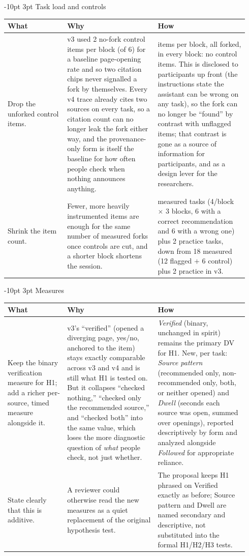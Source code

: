 \documentclass[9pt,letterpaper]{extarticle}
\makeatletter
\newcommand{\rowsep}{\noalign{\vskip 1.5pt}\arrayrulecolor{black!35}\hline\arrayrulecolor{black}\noalign{\vskip 1.5pt}}
\renewcommand\section{\@startsection{section}{1}{\z@}%
  {-10pt \@plus -2pt \@minus -1pt}{3pt}%
  {\sffamily\bfseries\large\color{accent}}}
\let\oldsection\section
\renewcommand{\section}{\needspace{7\baselineskip}\oldsection}
\newcommand{\wwh}{\toprule
\sffamily\bfseries\color{accent} What & \sffamily\bfseries\color{accent} Why & \sffamily\bfseries\color{accent} How \\
\midrule}
\newenvironment{wwhtable}{\footnotesize
\begin{longtable}{@{}>{\raggedright\arraybackslash}p{0.23\linewidth}>{\raggedright\arraybackslash}p{0.355\linewidth}>{\raggedright\arraybackslash}p{0.355\linewidth}@{}}
\wwh}{\bottomrule\end{longtable}}
\makeatother
\begin{document}
\section{Task load and controls}
\begin{wwhtable}
Drop the unforked control items. &
v3 used 2 no-fork control items per block (of 6) for a baseline
page-opening rate and so two citation chips never signalled a fork by
themselves. Every v4 trace already cites two sources on every task, so a
citation count can no longer leak the fork either way, and the
provenance-only form is itself the baseline for how often people check
when nothing announces anything. &
4 items per block, all forked, in every block: no control items. This is
disclosed to participants up front (the instructions state the assistant
can be wrong on any task), so the fork can no longer be ``found'' by
contrast with unflagged items; that contrast is gone as a source of
information for participants, and as a design lever for the researchers. \\
\rowsep
Shrink the item count. &
Fewer, more heavily instrumented items are enough for the same number of
measured forks once controls are cut, and a shorter block shortens the
session. &
12 measured tasks (4/block $\times$ 3 blocks, 6 with a correct
recommendation and 6 with a wrong one) plus 2 practice tasks, down from 18
measured (12 flagged $+$ 6 control) plus 2 practice in v3. \\
\end{wwhtable}

\section{Measures}
\begin{wwhtable}
Keep the binary verification measure for H1; add a richer per-source, timed
measure alongside it. &
v3's ``verified'' (opened a diverging page, yes/no, anchored to the item)
stays exactly comparable across v3 and v4 and is still what H1 is tested
on. But it collapses ``checked nothing,'' ``checked only the recommended
source,'' and ``checked both'' into the same value, which loses the more
diagnostic question of \emph{what} people check, not just whether. &
\emph{Verified} (binary, unchanged in spirit) remains the primary DV for
H1. New, per task: \emph{Source pattern} (recommended only, non-recommended
only, both, or neither opened) and \emph{Dwell} (seconds each source was
open, summed over openings), reported descriptively by form and analyzed
alongside \emph{Followed} for appropriate reliance. \\
\rowsep
State clearly that this is additive. &
A reviewer could otherwise read the new measures as a quiet replacement of
the original hypothesis test. &
The proposal keeps H1 phrased on Verified exactly as before; Source pattern
and Dwell are named secondary and descriptive, not substituted into the
formal H1/H2/H3 tests. \\
\end{wwhtable}
\end{document}
